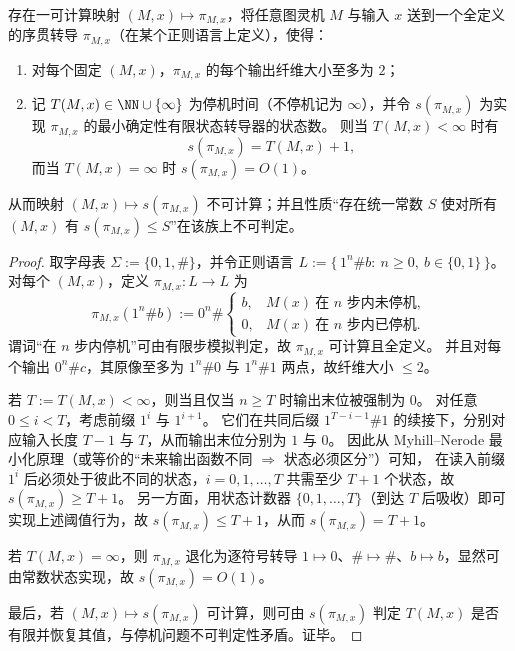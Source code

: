 \begin{theorem}[最小状态复杂度可编码停机时间]\label{thm:conclusion-minimal-state-complexity-halting}
存在一可计算映射 \((M,x)\mapsto \pi_{M,x}\)，将任意图灵机 \(M\) 与输入 \(x\) 送到一个全定义的序贯转导 \(\pi_{M,x}\)（在某个正则语言上定义），使得：
\begin{enumerate}
  \item 对每个固定 \((M,x)\)，\(\pi_{M,x}\) 的每个输出纤维大小至多为 \(2\)；
  \item 记 \(T(M,x)\in\NN\cup\{\infty\}\) 为停机时间（不停机记为 \(\infty\)），并令 \(s(\pi_{M,x})\) 为实现 \(\pi_{M,x}\) 的最小确定性有限状态转导器的状态数。
  则当 \(T(M,x)<\infty\) 时有
  \[
  s(\pi_{M,x})=T(M,x)+1,
  \]
  而当 \(T(M,x)=\infty\) 时 \(s(\pi_{M,x})=O(1)\)。
\end{enumerate}
从而映射 \((M,x)\mapsto s(\pi_{M,x})\) 不可计算；并且性质“存在统一常数 \(S\) 使对所有 \((M,x)\) 有 \(s(\pi_{M,x})\le S\)”在该族上不可判定。
\end{theorem}
\begin{proof}
取字母表 \(\Sigma:=\{0,1,\#\}\)，并令正则语言
\(
L:=\{\,1^n\# b:\ n\ge 0,\ b\in\{0,1\}\,\}
\)。
对每个 \((M,x)\)，定义 \(\pi_{M,x}:L\to L\) 为
\[
\pi_{M,x}(1^n\# b)
:=
0^n\#\begin{cases}
b,& M(x)\ \text{在 }n\text{ 步内未停机},\\
0,& M(x)\ \text{在 }n\text{ 步内已停机}.
\end{cases}
\]
谓词“在 \(n\) 步内停机”可由有限步模拟判定，故 \(\pi_{M,x}\) 可计算且全定义。
并且对每个输出 \(0^n\# c\)，其原像至多为 \(1^n\#0\) 与 \(1^n\#1\) 两点，故纤维大小 \(\le 2\)。
\par
若 \(T:=T(M,x)<\infty\)，则当且仅当 \(n\ge T\) 时输出末位被强制为 \(0\)。
对任意 \(0\le i<T\)，考虑前缀 \(1^i\) 与 \(1^{i+1}\)。
它们在共同后缀 \(1^{T-i-1}\#1\) 的续接下，分别对应输入长度 \(T-1\) 与 \(T\)，从而输出末位分别为 \(1\) 与 \(0\)。
因此从 Myhill--Nerode 最小化原理（或等价的“未来输出函数不同 \(\Rightarrow\) 状态必须区分”）可知，
在读入前缀 \(1^i\) 后必须处于彼此不同的状态，\(i=0,1,\dots,T\) 共需至少 \(T+1\) 个状态，故 \(s(\pi_{M,x})\ge T+1\)。
另一方面，用状态计数器 \(\{0,1,\dots,T\}\)（到达 \(T\) 后吸收）即可实现上述阈值行为，故 \(s(\pi_{M,x})\le T+1\)，从而 \(s(\pi_{M,x})=T+1\)。
\par
若 \(T(M,x)=\infty\)，则 \(\pi_{M,x}\) 退化为逐符号转导 \(1\mapsto 0\)、\(\#\mapsto \#\)、\(b\mapsto b\)，显然可由常数状态实现，故 \(s(\pi_{M,x})=O(1)\)。
\par
最后，若 \((M,x)\mapsto s(\pi_{M,x})\) 可计算，则可由 \(s(\pi_{M,x})\) 判定 \(T(M,x)\) 是否有限并恢复其值，与停机问题不可判定性矛盾。证毕。
\end{proof}

